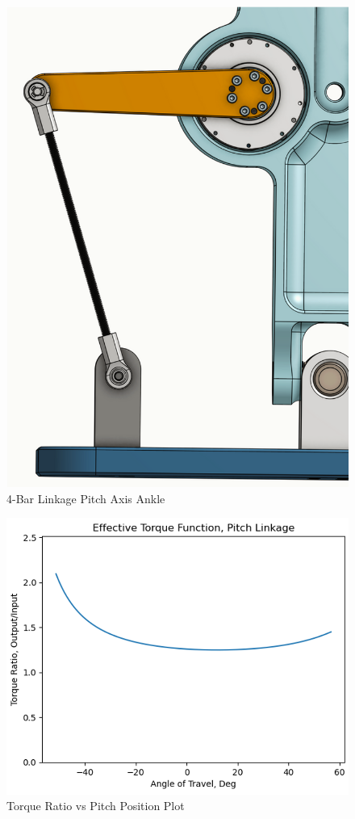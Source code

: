 \documentclass{article}
\begin{document}
\begin{figure}[H]
    \centering
    \includegraphics[scale=0.8]{assets/Design Presentation/Pitch Linkage.png}
    \caption{4-Bar Linkage Pitch Axis Ankle}
    \label{fig:enter-label}
\end{figure}

\begin{figure}[H]
    \centering
    \includegraphics[scale=0.8]{assets/Design Presentation/Torque Ratio Pitch.png}
    \caption{Torque Ratio vs Pitch Position Plot}
    \label{fig:enter-label}
\end{figure}
\end{document}
